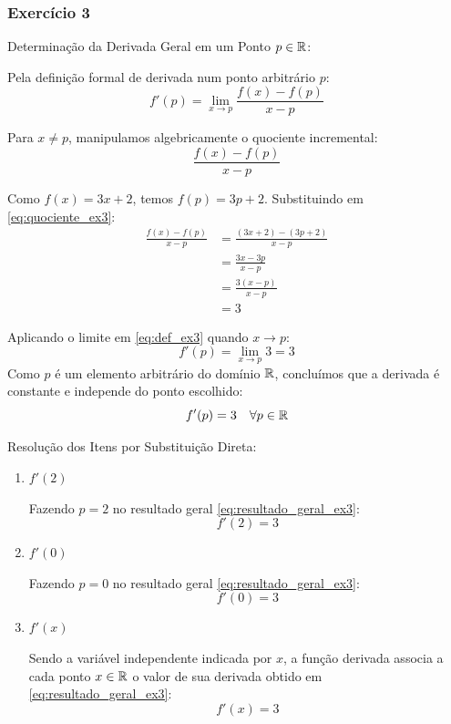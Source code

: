 \vspace{0.6cm}
\subsubsection*{Exercício 3}

Determinação da Derivada Geral em um Ponto $p \in \mathbb{R}$:

Pela definição formal de derivada num ponto arbitrário $p$:
\begin{equation}
    f'(p) = \lim_{x \to p} \frac{f(x) - f(p)}{x - p} \label{eq:def_ex3}
\end{equation}

Para $x \neq p$, manipulamos algebricamente o quociente incremental:
\begin{equation}
    \frac{f(x) - f(p)}{x - p} \label{eq:quociente_ex3}
\end{equation}

Como $f(x) = 3x + 2$, temos $f(p) = 3p + 2$. Substituindo em \eqref{eq:quociente_ex3}:
\begin{align*}
    \frac{f(x) - f(p)}{x - p} &= \frac{(3x + 2) - (3p + 2)}{x - p} \\[0.20cm]
    &= \frac{3x - 3p}{x - p} \\[0.20cm]
    &= \frac{3(x - p)}{x - p} \\[0.20cm]
    &= 3
\end{align*}

Aplicando o limite em \eqref{eq:def_ex3} quando $x \to p$:
\[
f'(p) = \lim_{x \to p} 3 = 3
\]
Como $p$ é um elemento arbitrário do domínio $\mathbb{R}$, concluímos que a derivada é constante e independe do ponto escolhido:
\begin{equation}
    f'(p) = 3 \quad \forall p \in \mathbb{R} \label{eq:resultado_geral_ex3}
\end{equation}

\vspace{0.3cm}
Resolução dos Itens por Substituição Direta:

\begin{enumerate}[label=\alph*)]
    \item $f'(2)$

    Fazendo $p = 2$ no resultado geral \eqref{eq:resultado_geral_ex3}:
    \[
    f'(2) = 3
    \]

    \item $f'(0)$

    Fazendo $p = 0$ no resultado geral \eqref{eq:resultado_geral_ex3}:
    \[
    f'(0) = 3
    \]

    \item $f'(x)$

    Sendo a variável independente indicada por $x$, a função derivada associa a cada ponto $x \in \mathbb{R}$ o valor de sua derivada obtido em \eqref{eq:resultado_geral_ex3}:
    \[
    f'(x) = 3
    \]
\end{enumerate}

